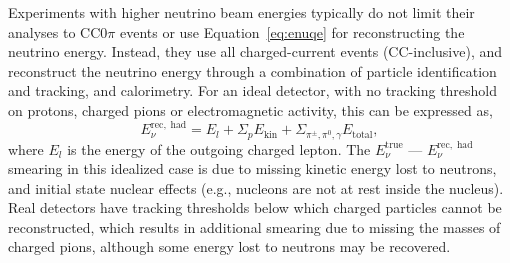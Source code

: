 \documentclass{ar-1col}
\begin{document}
Experiments with higher neutrino beam energies typically do not limit their analyses to CC0$\pi$ events or use Equation~\ref{eq:enuqe} for reconstructing the neutrino energy. Instead, they use all charged-current events (CC-inclusive), and reconstruct the neutrino energy through a combination of particle identification and tracking, and calorimetry. For an ideal detector, with no tracking threshold on protons, charged pions or electromagnetic activity, this can be expressed as,
\begin{equation}
E_{\nu}^{\mathrm{rec,\;had}} = E_{l} + \Sigma_{p} E_{\mathrm{kin}} + \Sigma_{\pi^{\pm}, \pi^{0}, \gamma} E_{\mathrm{total}},
\label{eq:enuhad}
\end{equation}
\noindent where $E_{l}$ is the energy of the outgoing charged lepton. The $E_{\nu}^{\mathrm{true}}$ --- $E_{\nu}^{\mathrm{rec,\;had}}$ smearing in this idealized case is due to missing kinetic energy lost to neutrons, and initial state nuclear effects (e.g., nucleons are not at rest inside the nucleus). Real detectors have tracking thresholds below which charged particles cannot be reconstructed, which results in additional smearing due to missing the masses of charged pions, although some energy lost to neutrons may be recovered.
\end{document}
